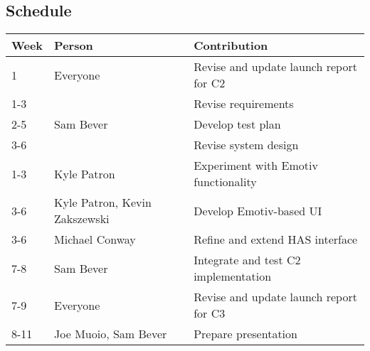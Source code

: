 \documentclass{report}
\begin{document}
\subsection*{Schedule}

\begin{tabular}{| l | l | l |}
    \hline
    Week & Person & Contribution \\
    \hline \hline

    1 & Everyone & Revise and update launch report for C2 \\ \hline
    1-3 & & Revise requirements \\ \hline
    2-5 & Sam Bever & Develop test plan \\ \hline
    3-6 & & Revise system design \\ \hline
    1-3 & Kyle Patron & Experiment with Emotiv functionality \\ \hline
    3-6 & Kyle Patron, Kevin Zakszewski & Develop Emotiv-based UI \\ \hline
    3-6 & Michael Conway & Refine and extend HAS interface \\ \hline
    7-8 & Sam Bever & Integrate and test C2 implementation \\ \hline
    7-9 & Everyone & Revise and update launch report for C3 \\ \hline
    8-11 & Joe Muoio, Sam Bever & Prepare presentation \\ \hline

\end{tabular}
\end{document}
